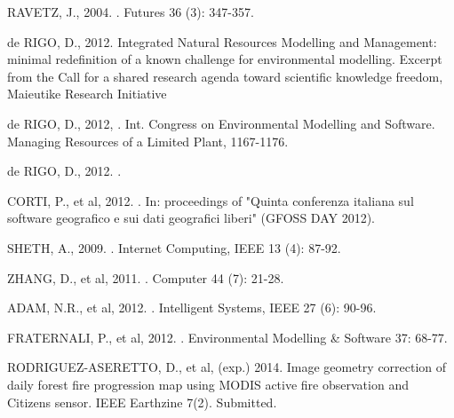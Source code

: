 \documentclass[12pt]{article}
\begin{document}
\begin{center}
{{\begin{spacing}{0.85}
\begin{nohyphens}
\begin{thebibliography}{43}
RAVETZ, J., 2004. . Futures 36 (3): 347-357.


de RIGO, D., 2012. Integrated Natural Resources Modelling and Management: minimal redefinition of a known challenge for environmental modelling. Excerpt from the Call for a shared research agenda toward scientific knowledge freedom, Maieutike Research Initiative 

de RIGO, D., 2012, . Int. Congress on Environmental Modelling and \mbox{Software}. Managing Resources of a Limited Plant, 1167-1176.


de RIGO, D., 2012. .


CORTI, P., et al, 2012. . In: proceedings of "Quinta conferenza italiana sul software geografico e sui dati geografici liberi" (GFOSS DAY 2012).


SHETH, A., 2009. . Internet Computing, IEEE 13 (4): 87-92.


ZHANG, D., et al, 2011. . Computer 44 (7): 21-28.


ADAM, N.R., et al, 2012. . Intelligent Systems, IEEE 27 (6): 90-96.


FRATERNALI, P., et al, 2012. . Environmental Modelling \& Software 37: 68-77.


RODRIGUEZ-ASERETTO, D., et al, (exp.) 2014. Image geometry correction of daily forest fire progression map using MODIS active fire observation and Citizens sensor. IEEE Earthzine 7(2). Submitted.



\end{thebibliography}
\end{nohyphens}
\end{spacing}}}
\end{center}
\end{document}
